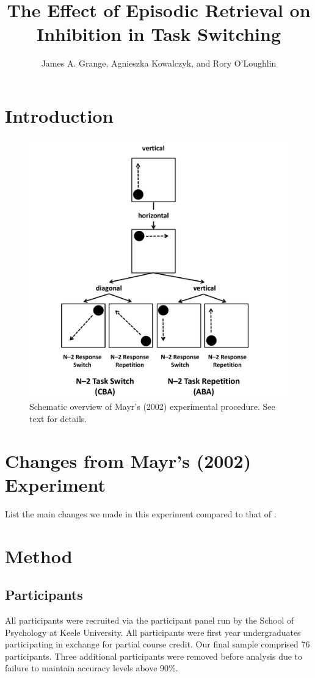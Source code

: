 \documentclass[a4paper, jou, natbib]{apa6}
\title{The Effect of Episodic Retrieval on Inhibition in Task Switching}
\author{James A. Grange, Agnieszka Kowalczyk, and Rory O'Loughlin}
\affiliation{School of Psychology, Keele University, UK}
\begin{document}
\maketitle

\section{Introduction}



\begin{figure}
\begin{center}
\includegraphics[width = 0.5 \textwidth]{Images/mayrExperiment.pdf}
\caption{Schematic overview of Mayr's (2002) experimental procedure. See text for details.}
\label{fig:mayrExperiment}
\end{center}
\end{figure}


\section{Changes from Mayr's (2002) Experiment}
List the main changes we made in this experiment compared to that of \cite{Mayr2002}.

\section{Method}

\subsection{Participants}
All participants were recruited via the participant panel run by the School of Psychology at Keele University. All participants were first year undergraduates participating in exchange for partial course credit. Our final sample comprised 76 participants. Three additional participants were removed before analysis due to failure to maintain accuracy levels above 90\%.
\end{document}
